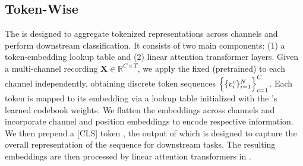 



\subsection{Token-Wise \encoder}
\label{sec:tfm_encoder}
The \encoder is designed to aggregate tokenized representations across channels and perform downstream classification. It consists of two main components: (1) a token-embedding lookup table and (2) linear attention transformer layers. Given a multi-channel recording $\mathbf{X}\in\mathbb{R}^{C\times T}$, we apply the fixed (pretrained) \tokenizer to each channel independently, obtaining discrete token sequences $\Bigl\{\{v_i^c\}_{i=1}^N\Bigr\}_{c=1}^C$. Each token is mapped to its embedding via a lookup table initialized with the \tokenizer’s learned codebook weights. 
We flatten the embeddings across channels and incorporate channel and position embeddings to encode respective information. 
We then prepend a [CLS] token \cite{devlin2018bert}, the output of which is designed to capture the overall representation of the sequence for downstream tasks. 
The resulting embeddings are then processed by linear attention transformers in \encoder.

